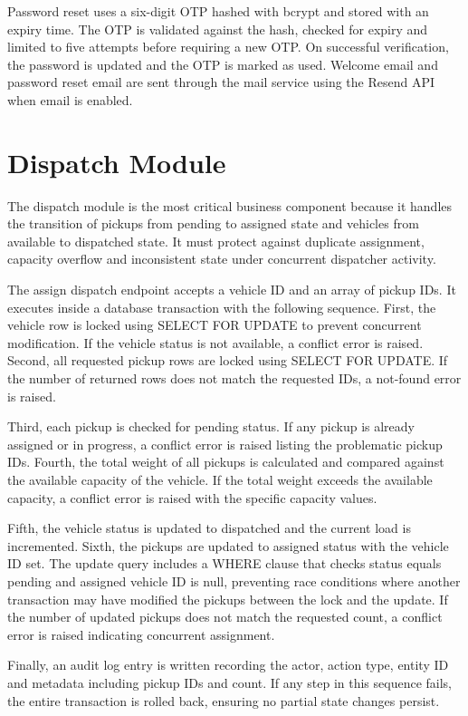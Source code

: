 \documentclass[12pt,a4paper]{report}
\begin{document}
Password reset uses a six-digit OTP hashed with bcrypt and stored with an expiry time. The OTP is validated against the hash, checked for expiry and limited to five attempts before requiring a new OTP. On successful verification, the password is updated and the OTP is marked as used. Welcome email and password reset email are sent through the mail service using the Resend API when email is enabled.

\section{Dispatch Module}
The dispatch module is the most critical business component because it handles the transition of pickups from pending to assigned state and vehicles from available to dispatched state. It must protect against duplicate assignment, capacity overflow and inconsistent state under concurrent dispatcher activity.

The assign dispatch endpoint accepts a vehicle ID and an array of pickup IDs. It executes inside a database transaction with the following sequence. First, the vehicle row is locked using SELECT FOR UPDATE to prevent concurrent modification. If the vehicle status is not available, a conflict error is raised. Second, all requested pickup rows are locked using SELECT FOR UPDATE. If the number of returned rows does not match the requested IDs, a not-found error is raised.

Third, each pickup is checked for pending status. If any pickup is already assigned or in progress, a conflict error is raised listing the problematic pickup IDs. Fourth, the total weight of all pickups is calculated and compared against the available capacity of the vehicle. If the total weight exceeds the available capacity, a conflict error is raised with the specific capacity values.

Fifth, the vehicle status is updated to dispatched and the current load is incremented. Sixth, the pickups are updated to assigned status with the vehicle ID set. The update query includes a WHERE clause that checks status equals pending and assigned vehicle ID is null, preventing race conditions where another transaction may have modified the pickups between the lock and the update. If the number of updated pickups does not match the requested count, a conflict error is raised indicating concurrent assignment.

Finally, an audit log entry is written recording the actor, action type, entity ID and metadata including pickup IDs and count. If any step in this sequence fails, the entire transaction is rolled back, ensuring no partial state changes persist.
\end{document}
